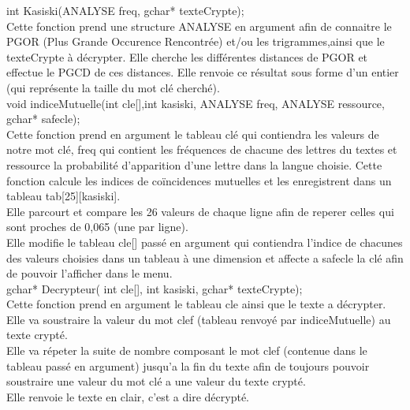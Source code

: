 \documentclass[a4]{article}
\begin{document}
	int Kasiski(ANALYSE freq, gchar* texteCrypte);\\
		Cette fonction prend une structure ANALYSE en argument afin de connaitre le 
		PGOR (Plus Grande Occurence Rencontrée) et/ou les trigrammes,ainsi que le texteCrypte à décrypter.
		Elle cherche les différentes distances de PGOR et effectue le PGCD de ces distances.
		Elle renvoie ce résultat sous forme d'un entier (qui représente la taille du mot clé cherché).\\
	
	void indiceMutuelle(int cle[],int kasiski, ANALYSE freq, ANALYSE ressource, gchar* safecle);\\
		Cette fonction prend en argument le tableau clé qui contiendra les valeurs de notre mot clé,
		freq qui contient les fréquences de chacune des lettres du textes et ressource la
		probabilité d'apparition d'une lettre dans la langue choisie.
		Cette fonction calcule les indices de coïncidences mutuelles et les enregistrent dans un tableau tab[25][kasiski].\\
		Elle parcourt et compare les 26 valeurs de chaque ligne afin de reperer celles qui sont proches de 0,065
		(une par ligne).\\
		Elle modifie le tableau cle[] passé en argument qui contiendra l'indice de chacunes des valeurs choisies dans un 
		tableau à une dimension et affecte a safecle la clé afin de pouvoir l'afficher dans le menu. \\
	
	gchar* Decrypteur( int cle[], int kasiski, gchar* texteCrypte);\\
		Cette fonction prend en argument le tableau cle ainsi que le texte a décrypter.
		Elle va soustraire la valeur du mot clef (tableau renvoyé par indiceMutuelle) au texte crypté.\\
		Elle va répeter la suite de nombre composant le mot clef (contenue dans le tableau passé en argument) jusqu'a
		la fin du texte afin de toujours pouvoir soustraire une valeur du mot clé a une valeur du texte crypté.\\
		Elle renvoie le texte en clair, c'est a dire décrypté.\\
		
\end{document}
